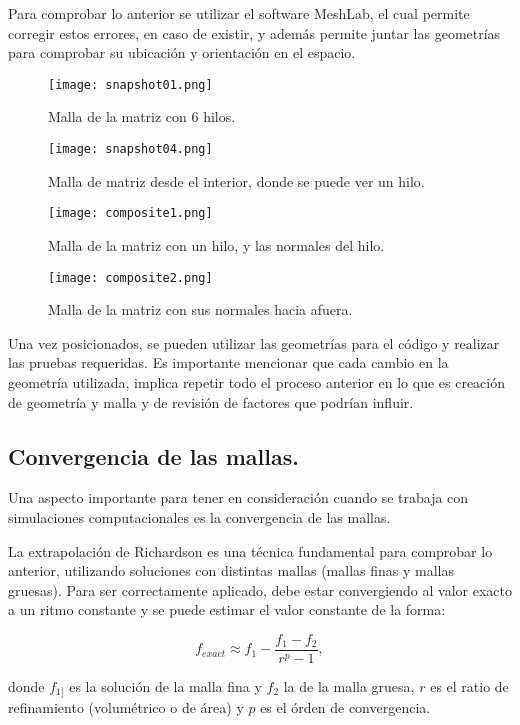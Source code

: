 \documentclass[12pt,letterpaper]{article}
\numberwithin{equation}{section}
\begin{document}
Para comprobar lo anterior se utilizar el software MeshLab, el cual permite corregir estos errores, en caso de existir, y además permite juntar las geometrías para comprobar su ubicación y orientación en el espacio.

\begin{figure}[H]
	\centering\texttt{[image: snapshot01.png]}
	\caption{Malla de la matriz con 6 hilos.}
\end{figure}

\begin{figure}[H]
	\centering\texttt{[image: snapshot04.png]}
	\caption{Malla de matriz desde el interior, donde se puede ver un hilo.}
\end{figure}

\begin{figure}[H]
	\centering\texttt{[image: composite1.png]}
	\caption{Malla de la matriz con un hilo, y las normales del hilo.}
\end{figure}

\begin{figure}[H]
	\centering\texttt{[image: composite2.png]}
	\caption{Malla de la matriz con sus normales hacia afuera.}
\end{figure}

Una vez posicionados, se pueden utilizar las geometrías para el código y realizar las pruebas requeridas. Es importante mencionar que cada cambio en la geometría utilizada, implica repetir todo el proceso anterior en lo que es creación de geometría y malla y de revisión de factores que podrían influir.

\subsection{Convergencia de las mallas.}

Una aspecto importante para tener en consideración cuando se trabaja con simulaciones computacionales es la convergencia de las mallas.

La extrapolación de Richardson es una técnica fundamental para comprobar lo anterior, utilizando soluciones con distintas mallas (mallas finas y mallas gruesas). Para ser correctamente aplicado, debe estar convergiendo al valor exacto a un ritmo constante y se puede estimar el valor constante de la forma:

$$f_{exact}\approx f_1-\frac{f_1-f_2}{r^p-1},$$

donde $f_{1]}$ es la solución de la malla fina y $f_{2}$ la de la malla gruesa, $r$ es el ratio de refinamiento (volumétrico o de área) y $p$ es el órden de convergencia. 
\end{document}
